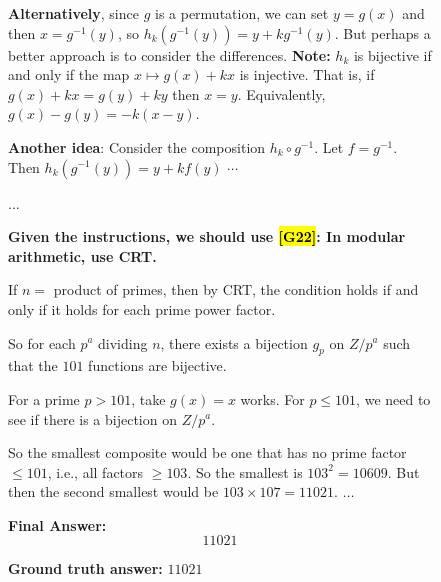 \documentclass{article}
\theoremstyle{plain}
\theoremstyle{definition}
\theoremstyle{remark}
\begin{document}
\begin{figure}[!tb]
\begin{runcard}[title={Example of How E-SPL Shapes Model Behavior}]
\begin{runbox}[title={Model Output}]
\textbf{Alternatively}, since \(g\) is a permutation, we can set \(y = g(x)\) and then \(x = g^{-1}(y)\), so
$h_k(g^{-1}(y)) = y + k g^{-1}(y).$
{But perhaps} a better approach is to consider the differences.
\textbf{Note:}
\(h_k\) is bijective if and only if the map \(x \mapsto g(x) + kx\) is injective. That is, if
$g(x) + kx = g(y) + ky$
then \(x = y\). Equivalently, $g(x) - g(y) = -k(x-y).$

\textbf{Another idea}: Consider the composition \(h_k \circ g^{-1}\). Let \(f = g^{-1} \). Then \(h_k(g^{-1}(y)) = y + k f(y)\) $\cdots$

$\dots$

{\color{Brown}\textbf{Given the instructions, we should use \hl{[G22]}: In modular arithmetic, use CRT.}}

If $n=$ product of primes, then by CRT, the condition holds if and only if it holds for each prime power factor.

So for each $p^a$ dividing $n$, there exists a bijection $g_p$ on $Z/p^a$ such that the $101$ functions are bijective.

For a prime $p > 101$, take $g(x)=x$ works. For $p \le 101$, we need to see if there is a bijection on $Z/p^a$.

So the smallest composite would be one that has no prime factor $\le 101$, i.e., all factors $\ge 103$. So the smallest is $103^2=10609$. But then the second smallest would be $103\times 107=11021$. \quad $\dots$

\medskip
\textbf{Final Answer:}
\[
\boxed{11021}
\]

\end{runbox}

\textbf{Ground truth answer:} $11021$
\end{runcard}
\label{fig:example-e-spl-1}

\end{figure}
\end{document}
